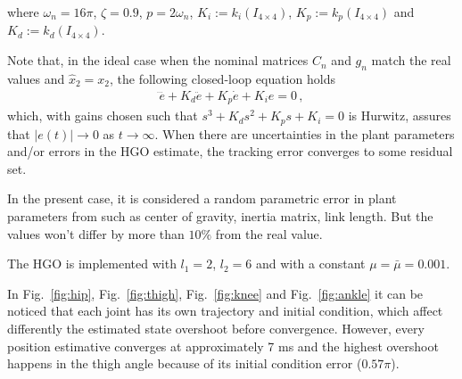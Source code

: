 \documentclass[letterpaper, 10 pt, journal, twocolumn]{IEEEtran}  %
\theoremstyle{plain}
\theoremstyle{definition}
\theoremstyle{remark}
\begin{document}
where $\omega_n = 16\pi$, $\zeta = 0.9$, $p = 2\omega_n$, $K_i := k_i(I_{4 \times 4})$, $K_p := k_p(I_{4 \times 4})$ and $K_d := k_d(I_{4 \times 4})$.
%


Note that, in the ideal case when the nominal matrices $C_n$ and $g_n$ match the real values and $\hat{x}_2=x_2$, the following closed-loop equation holds
%
\begin{align}
\dddot{e} + K_d \ddot{e} + K_p \dot{e} + K_i e =0\,,
\label{eq:closed}
\end{align}
%
which, with gains chosen such that $s^3 + K_d s^2 + K_p s + K_i = 0$ is Hurwitz, assures that $|e(t)| \rightarrow 0$ as $t \rightarrow \infty$. When  there are uncertainties in the plant parameters and/or errors in the HGO estimate, the tracking error converges to some residual set.

In the present case, it is considered a random parametric error in plant parameters from \cite{Richter2015} such as center of gravity, inertia matrix, link length. But the values won't differ by more than $10\%$ from the real value.


The HGO is implemented with $l_1=2$, $l_2=6$ and with a constant $\mu=\bar{\mu}=0.001$.
%
%

In Fig.~\ref{fig:hip}, Fig.~\ref{fig:thigh}, Fig.~\ref{fig:knee} and Fig.~\ref{fig:ankle} it can be noticed that each joint has its own trajectory and initial condition, which affect differently the estimated state overshoot before convergence. However, every position estimative converges at approximately 7 ms and the highest overshoot happens in the thigh angle because of its initial condition error ($0.57\pi$).
\end{document}
